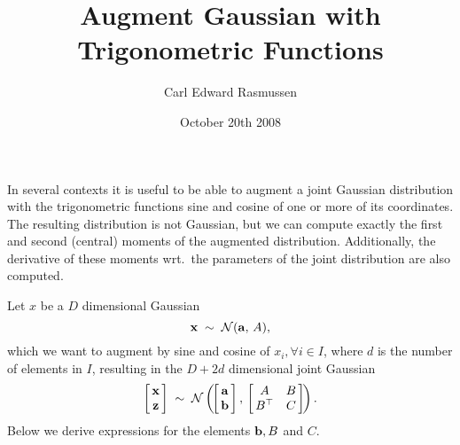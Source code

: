 \documentclass{article}
\title{Augment Gaussian with Trigonometric Functions}
\author{Carl Edward Rasmussen}
\date{October 20th 2008}
\newcommand{\bfa}{{\bf a}}
\newcommand{\bfb}{{\bf b}}
\newcommand{\bfz}{{\bf z}}
\newcommand{\bfx}{{\bf x}}
\begin{document}
\maketitle

In several contexts it is useful to be able to augment a joint
Gaussian distribution with the trigonometric functions sine and cosine
of one or more of its coordinates. The resulting distribution is not
Gaussian, but we can compute exactly the first and second (central)
moments of the augmented distribution. Additionally, the derivative of
these moments wrt.~the parameters of the joint distribution are also
computed.

Let $x$ be a $D$ dimensional Gaussian
\[
\bfx\;\sim\;{\cal N}(\bfa,\,A),
\]
which we want to augment by sine and cosine of $x_i, \forall i\in I$,
where $d$ is the number of elements in $I$, resulting in the
$D\!+\!2d$ dimensional joint Gaussian
\[
\left[\!\!\begin{array}{c}\bfx\\ \bfz\end{array}\!\!\right]\;\sim\;
{\cal N}\left(\!\left[\!\!\begin{array}{c}\bfa\\
      \bfb\end{array}\!\!\right],\,
\left[\!\!\begin{array}{cc}A&B\\B^\top&C\end{array}\!\!\right]\!\right).
\]
Below we derive expressions for the elements $\bfb, B$ and $C$.
\end{document}
